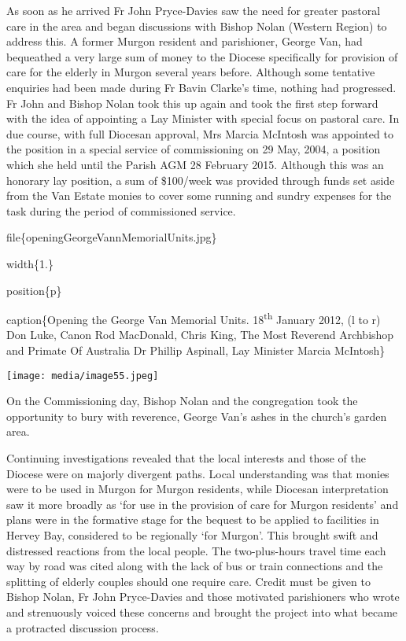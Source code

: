 As soon as he arrived Fr John Pryce-Davies saw the need for greater pastoral care in the area and began discussions with Bishop Nolan (Western Region) to address this. A former Murgon resident and parishioner, George Van, had bequeathed a very large sum of money to the Diocese specifically for provision of care for the elderly in Murgon several years before. Although some tentative enquiries had been made during Fr Bavin Clarke's time, nothing had progressed. Fr John and Bishop Nolan took this up again and took the first step forward with the idea of appointing a Lay Minister with special focus on pastoral care. In due course, with full Diocesan approval, Mrs Marcia McIntosh was appointed to the position in a special service of commissioning on 29 May, 2004, a position which she held until the Parish AGM 28 February 2015. Although this was an honorary lay position, a sum of \$100/week was provided through funds set aside from the Van Estate monies to cover some running and sundry expenses for the task during the period of commissioned service.

file\{openingGeorgeVannMemorialUnits.jpg\}

width\{1.\}

position\{p\}

caption\{Opening the George Van Memorial Units. 18\textsuperscript{th} January 2012, (l to r) Don Luke, Canon Rod MacDonald, Chris King, The Most Reverend Archbishop and Primate Of Australia Dr Phillip Aspinall, Lay Minister Marcia McIntosh\}

\texttt{[image: media/image55.jpeg]}

On the Commissioning day, Bishop Nolan and the congregation took the opportunity to bury with reverence, George Van's ashes in the church's garden area.

Continuing investigations revealed that the local interests and those of the Diocese were on majorly divergent paths. Local understanding was that monies were to be used in Murgon for Murgon residents, while Diocesan interpretation saw it more broadly as `for use in the provision of care for Murgon residents' and plans were in the formative stage for the bequest to be applied to facilities in Hervey Bay, considered to be regionally `for Murgon'. This brought swift and distressed reactions from the local people. The two-plus-hours travel time each way by road was cited along with the lack of bus or train connections and the splitting of elderly couples should one require care. Credit must be given to Bishop Nolan, Fr John Pryce-Davies and those motivated parishioners who wrote and strenuously voiced these concerns and brought the project into what became a protracted discussion process.

